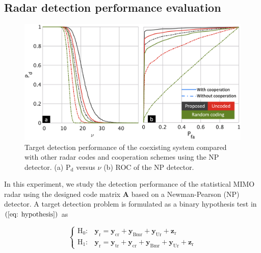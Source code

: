 \documentclass[9pt,journal]{IEEEtran}
\newcommand{\paren}[1]{\left({#1}\right)}
\theoremstyle{definition}
\begin{document}
\subsection{Radar detection performance evaluation}
\begin{figure}[t]
\centering
\includegraphics[width=1.0\columnwidth]{NPdetector.png}
\caption{Target detection performance of the coexisting system compared with other radar codes and cooperation schemes using the NP detector. (a) $\mathrm{P}_{\textrm{d}}$ versus $\nu$ (b) ROC of the NP detector.}
\label{fig: NPdetector}
\vspace{-1em}
\end{figure}
In this experiment, we study the detection performance of the statistical MIMO radar using the designed code matrix $\mathbf{A}$ based on a Newman-Pearson (NP) detector. A target detection problem is formulated as a binary hypothesis test in $\paren{\ref{eq: hypothesis}}$ as
\par\noindent\small
\begin{equation}
\label{eq: hypothesis}
\begin{cases}
\mathrm{H}_{\mathrm{0}}: & \mathbf{y}_{\textrm{r}} = \mathbf{y}_{\textrm{cr}}+\mathbf{y}_{\textrm{Bmr}}+\mathbf{y}_{\textrm{Ur}}+\mathbf{z}_{\textrm{r}}
\\
\mathrm{H}_{\mathrm{1}}: & \mathbf{y}_{\mathrm{r}} = \mathbf{y}_{\textrm{tr}}+ \mathbf{y}_{\textrm{cr}}+\mathbf{y}_{\textrm{Bmr}}+\mathbf{y}_{\textrm{Ur}}+\mathbf{z}_{\textrm{r}}
\end{cases}
\end{equation}
\end{document}
